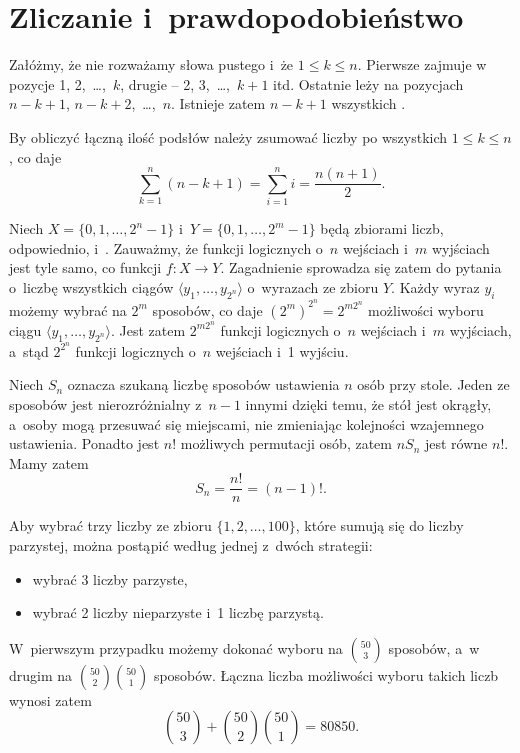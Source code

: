 \chapter{Zliczanie i~prawdopodobieństwo}


\exercise{} %
Załóżmy, że nie rozważamy słowa pustego i~że $1\le k\le n$. Pierwsze  zajmuje w~ pozycje 1, 2,~\dots,~$k$, drugie -- 2, 3,~\dots,~$k+1$ itd. Ostatnie  leży na pozycjach $n-k+1$, $n-k+2$,~\dots,~$n$. Istnieje zatem $n-k+1$ wszystkich  .

By obliczyć łączną ilość podsłów  należy zsumować liczby  po wszystkich $1\le k\le n$, co daje
\[
	\sum_{k=1}^n(n-k+1) = \sum_{i=1}^ni = \frac{n(n+1)}{2}.
\]

\exercise{} %
Niech $X=\{0,1,\dots,2^n-1\}$ i~$Y=\{0,1,\dots,2^m-1\}$ będą zbiorami liczb, odpowiednio,  i~. Zauważmy, że funkcji logicznych o~$n$ wejściach i~$m$ wyjściach jest tyle samo, co funkcji $f\colon X\to Y$. Zagadnienie sprowadza się zatem do pytania o~liczbę wszystkich ciągów $\langle y_1,\dots,y_{2^n}\!\rangle$ o~wyrazach ze zbioru  $Y$. Każdy wyraz $y_i$ możemy wybrać na $2^m$ sposobów, co daje $(2^m)^{2^n}=2^{m2^n}\!$ możliwości wyboru ciągu $\langle y_1,\dots,y_{2^n}\!\rangle$. Jest zatem $2^{m2^n}\!$ funkcji logicznych o~$n$ wejściach i~$m$ wyjściach, a~stąd $2^{2^n}\!$ funkcji logicznych o~$n$ wejściach i~1 wyjściu.

\exercise{} %
Niech $S_n$ oznacza szukaną liczbę sposobów ustawienia $n$ osób przy stole. Jeden ze sposobów jest nierozróżnialny z~$n-1$ innymi dzięki temu, że stół jest okrągły, a~osoby mogą przesuwać się miejscami, nie zmieniając kolejności wzajemnego ustawienia. Ponadto jest $n!$ możliwych permutacji osób, zatem $nS_n$ jest równe $n!$. Mamy zatem
\[
	S_n = \frac{n!}{n} = (n-1)!.
\]

\exercise{} %
Aby wybrać trzy liczby ze zbioru $\{1,2,\dots,100\}$, które sumują się do liczby parzystej, można postąpić według jednej z~dwóch strategii:
\begin{itemize}
	\item wybrać 3 liczby parzyste,
	\item wybrać 2 liczby nieparzyste i~1 liczbę parzystą.
\end{itemize}
W~pierwszym przypadku możemy dokonać wyboru na $\binom{50}{3}$ sposobów, a~w drugim na $\binom{50}{2}\binom{50}{1}$ sposobów. Łączna liczba możliwości wyboru takich liczb wynosi zatem
\[
	\binom{50}{3}+\binom{50}{2}\binom{50}{1} = 80850.
\]

